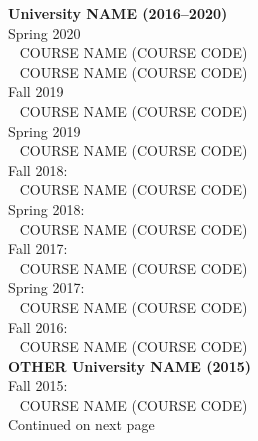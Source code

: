 \newpage
{}

\newpage



\begin{table}[H]
\centering
\label{Teaching_assignment}
\begin{tcolorbox}[colback=yellow!10!white,colframe=csuOrange,title=\caption{A complete list of the courses taught by Dr. X.}]
\begin{tcolorbox}[tab2,tabularx={l}]
{\bf University NAME (2016--2020)}  \\
 \toprule
%
Spring 2020 \\
\quad\faCaretRight~ COURSE NAME (COURSE CODE) \\
\quad\faCaretRight~  COURSE NAME (COURSE CODE) \\
%
Fall 2019 \\
\quad\faCaretRight~ COURSE NAME (COURSE CODE) \\
%
Spring 2019 \\
\quad\faCaretRight~ COURSE NAME (COURSE CODE) \\
%
Fall 2018: \\
\quad\faCaretRight~ COURSE NAME (COURSE CODE) \\
%
Spring 2018: \\
\quad\faCaretRight~ COURSE NAME (COURSE CODE) \\
%
Fall 2017: \\
\quad\faCaretRight~ COURSE NAME (COURSE CODE) \\
%
 Spring 2017:  \\
\quad\faCaretRight~ COURSE NAME (COURSE CODE) \\
%
Fall 2016:  \\
\quad\faCaretRight~ COURSE NAME (COURSE CODE) \\
%
  \specialrule{1.5pt}{1pt}{1pt}
%
%
{\bf OTHER University NAME (2015)}  \\
 \midrule
 Fall 2015: \\
\quad\faCaretRight~  COURSE NAME (COURSE CODE) \\
%
\bottomrule
\hskip9.5cm  Continued on next page \faCaretRight\faCaretRight\faCaretRight
    \\
\bottomrule
\end{tcolorbox}
\end{tcolorbox}
\end{table}


